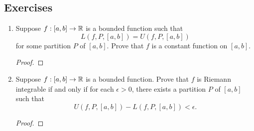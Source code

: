 \documentclass[11pt,a4paper]{book}
\begin{document}
\subsection{Exercises}

\begin{enumerate}
    \item Suppose \( f:[a,b] \to \mathbb{R}  \) is a bounded function such that
        \[  L(f,P,[a,b]) = U(f,P,[a,b]) \]
        for some partition \( P  \) of \( [a,b] \). Prove that \( f \) is a constant function on \( [a,b] \).
        \begin{proof}
         
        \end{proof}
    \item Suppose \( f: [a,b] \to \mathbb{R}  \) is a bounded function. Prove that \( f  \) is Riemann integrable if and only if for each \( \epsilon > 0  \), there exists a partition \( P  \) of \( [a,b] \) such that 
        \[  U(f,P,[a,b]) - L(f,P,[a,b]) < \epsilon. \]
        \begin{proof}
        
        \end{proof}
\end{enumerate}
\end{document}

